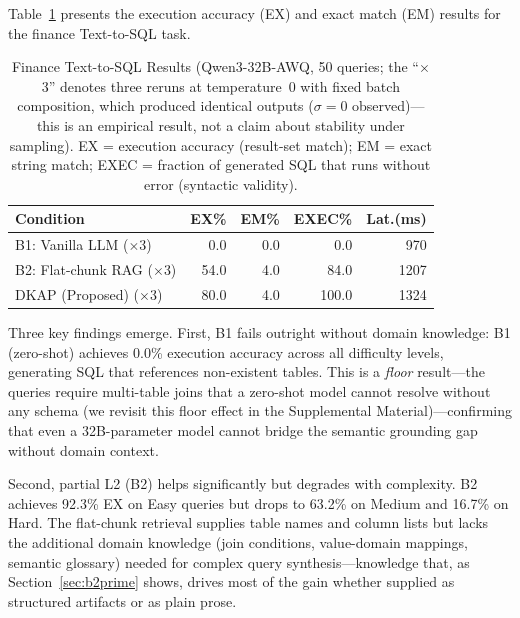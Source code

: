 \documentclass[fleqn,10pt,lineno]{wlpeerj}
\begin{document}
Table~\ref{tab:finance_results} presents the execution accuracy (EX) and exact match (EM) results for the finance Text-to-SQL task.

\begin{table}[H]
\centering
\caption{Finance Text-to-SQL Results (Qwen3-32B-AWQ, 50 queries; the ``$\times$3'' denotes three reruns at temperature~$0$ with fixed batch composition, which produced identical outputs ($\sigma=0$ observed)---this is an empirical result, not a claim about stability under sampling). EX = execution accuracy (result-set match); EM = exact string match; EXEC = fraction of generated SQL that runs without error (syntactic validity).}
\label{tab:finance_results}
\footnotesize
\begin{tabularx}{\columnwidth}{@{}Xrrrr@{}}
\toprule
\textbf{Condition} & \textbf{EX\%} & \textbf{EM\%} & \textbf{EXEC\%} & \textbf{Lat.(ms)} \\
\midrule
B1: Vanilla LLM ($\times$3)  & 0.0  & 0.0 & 0.0   & 970  \\
B2: Flat-chunk RAG ($\times$3) & 54.0 & 4.0 & 84.0  & 1207 \\
DKAP (Proposed) ($\times$3)  & 80.0 & 4.0 & 100.0 & 1324 \\
\bottomrule
\end{tabularx}
\end{table}

Three key findings emerge. First, B1 fails outright without domain knowledge: B1 (zero-shot) achieves 0.0\% execution accuracy across all difficulty levels, generating SQL that references non-existent tables. This is a \textit{floor} result---the queries require multi-table joins that a zero-shot model cannot resolve without any schema (we revisit this floor effect in the Supplemental Material)---confirming that even a 32B-parameter model cannot bridge the semantic grounding gap without domain context.

Second, partial L2 (B2) helps significantly but degrades with complexity. B2 achieves 92.3\% EX on Easy queries but drops to 63.2\% on Medium and 16.7\% on Hard. The flat-chunk retrieval supplies table names and column lists but lacks the additional domain knowledge (join conditions, value-domain mappings, semantic glossary) needed for complex query synthesis---knowledge that, as Section~\ref{sec:b2prime} shows, drives most of the gain whether supplied as structured artifacts or as plain prose.
\end{document}
